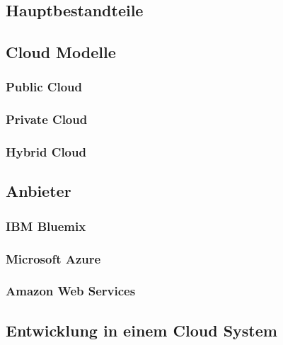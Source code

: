 
\subsection{Hauptbestandteile}

\subsection{Cloud Modelle}

\subsubsection{Public Cloud}

\subsubsection{Private Cloud}

\subsubsection{Hybrid Cloud}

\subsection{Anbieter}
\subsubsection{IBM Bluemix}
\subsubsection{Microsoft Azure}
\subsubsection{Amazon Web Services}

\subsection{Entwicklung in einem Cloud System}